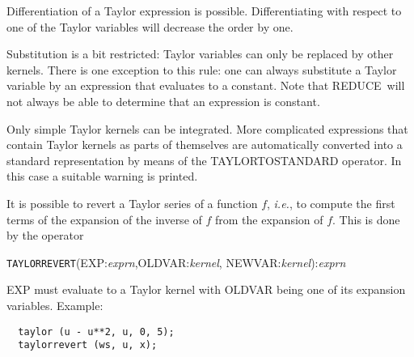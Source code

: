 \documentclass[11pt,letterpaper]{book}
\newcommand{\REDUCE}{REDUCE}
\begin{document}
Differentiation of a Taylor expression is possible.  Differentiating
with respect to one of the Taylor variables will decrease the order by one.

Substitution is a bit restricted: Taylor variables can only be replaced
by other kernels.  There is one exception to this rule: one can always
substitute a Taylor variable by an expression that evaluates to a
constant.  Note that \REDUCE\ will not always be able to determine
that an expression is constant.

Only simple Taylor kernels can be integrated. More complicated
expressions that contain Taylor kernels as parts of themselves are
automatically converted into a standard representation by means of the
TAYLORTOSTANDARD operator.  In this case a suitable warning is printed.

 It is possible to revert a Taylor
series of a function $f$, {\em i.e.}, to compute the first terms of the
expansion of the inverse of $f$ from the expansion of $f$. This is
done by the operator

\hspace*{2em} {\tt TAYLORREVERT}(EXP:{\em exprn},OLDVAR:{\em kernel},
                                 NEWVAR:{\em kernel}):{\em exprn}

EXP must evaluate to a Taylor kernel with OLDVAR being one of its
expansion variables. Example:

{\small\begin{verbatim}
  taylor (u - u**2, u, 0, 5);
  taylorrevert (ws, u, x);
\end{verbatim}}
\end{document}
